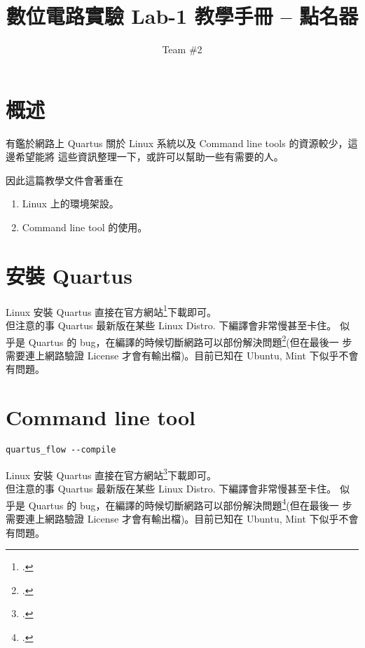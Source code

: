 \documentclass[12pt, a4paper]{article}
\title{數位電路實驗 Lab-1 教學手冊 -- 點名器}
\author{Team \#2}
\begin{document}
\maketitle

\section{概述}
有鑑於網路上 Quartus 關於 Linux 系統以及 Command line tools 的資源較少，這邊希望能將
這些資訊整理一下，或許可以幫助一些有需要的人。

因此這篇教學文件會著重在
\begin{enumerate}
  \item Linux 上的環境架設。
  \item Command line tool 的使用。
\end{enumerate}

\section{安裝 Quartus}
Linux 安裝 Quartus 直接在官方網站\footcite{QuartusDL}下載即可。 \\

但注意的事 Quartus 最新版在某些 Linux Distro. 下編譯會非常慢甚至卡住。
似乎是 Quartus 的 bug，在編譯的時候切斷網路可以部份解決問題\footcite{QuartusBugHack}(但在最後一
步需要連上網路驗證 License 才會有輸出檔)。目前已知在 Ubuntu, Mint 下似乎不會有問題。

\section{Command line tool}
\begin{verbatim}
quartus_flow --compile
\end{verbatim}
Linux 安裝 Quartus 直接在官方網站\footcite{QuartusDL}下載即可。 \\

但注意的事 Quartus 最新版在某些 Linux Distro. 下編譯會非常慢甚至卡住。
似乎是 Quartus 的 bug，在編譯的時候切斷網路可以部份解決問題\footcite{QuartusBugHack}(但在最後一
步需要連上網路驗證 License 才會有輸出檔)。目前已知在 Ubuntu, Mint 下似乎不會有問題。
\end{document}
